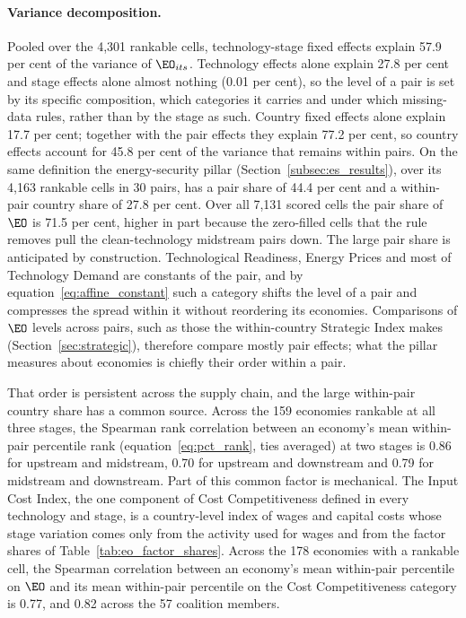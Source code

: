\paragraph{Variance decomposition.} Pooled over the 4{,}301 rankable cells, technology-stage fixed
effects explain 57.9 per cent of the variance of $\EO_{its}$. Technology effects alone explain 27.8
per cent and stage effects alone almost nothing (0.01 per cent), so the level of a pair is set by
its specific composition, which categories it carries and under which missing-data rules, rather
than by the stage as such. Country fixed effects alone explain 17.7 per cent; together with the
pair effects they explain 77.2 per cent, so country effects account for 45.8 per cent of the
variance that remains within pairs. On the same definition the energy-security pillar
(Section~\ref{subsec:es_results}), over its 4{,}163 rankable cells in 30 pairs, has a pair share of
44.4 per cent and a within-pair country share of 27.8 per cent. Over all 7{,}131 scored cells the
pair share of $\EO$ is 71.5 per cent, higher in part because the zero-filled cells that the rule
removes pull the clean-technology midstream pairs down. The large pair share is anticipated by
construction. Technological Readiness, Energy Prices and most of Technology Demand are constants of
the pair, and by equation~\eqref{eq:affine_constant} such a category shifts the level of a pair
and compresses the spread within it without reordering its economies. Comparisons of $\EO$ levels
across pairs, such as those the within-country Strategic Index makes (Section~\ref{sec:strategic}),
therefore compare mostly pair effects; what the pillar measures about economies is chiefly their
order within a pair.

That order is persistent across the supply chain, and the large within-pair country share has a
common source. Across the 159 economies rankable at all three stages, the Spearman rank correlation
between an economy's mean within-pair percentile rank (equation~\eqref{eq:pct_rank}, ties averaged)
at two stages is 0.86 for upstream and midstream, 0.70 for upstream and downstream and 0.79 for
midstream and downstream. Part of this common factor is mechanical. The Input Cost Index, the one
component of Cost Competitiveness defined in every technology and stage, is a country-level index
of wages and capital costs whose stage variation comes only from the activity used for wages and
from the factor shares of Table~\ref{tab:eo_factor_shares}. Across the 178 economies with a
rankable cell, the Spearman correlation between an economy's mean within-pair percentile on $\EO$
and its mean within-pair percentile on the Cost Competitiveness category is 0.77, and 0.82 across
the 57 coalition members.

